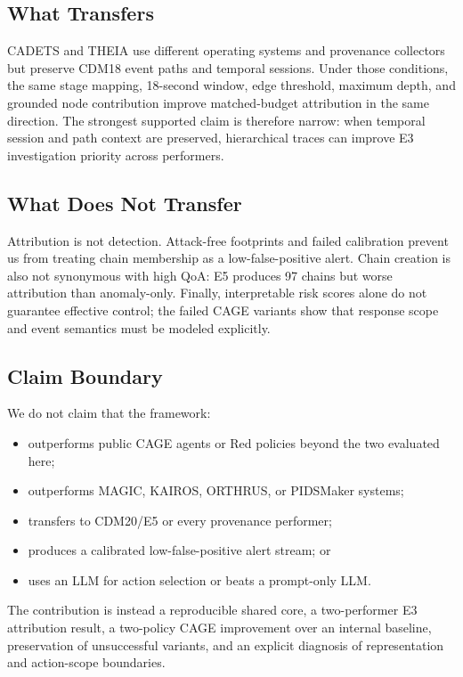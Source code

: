 \documentclass[runningheads]{llncs}
\begin{document}
\subsection{What Transfers}

CADETS and THEIA use different operating systems and provenance collectors but preserve CDM18 event paths and temporal sessions. Under those conditions, the same stage mapping, 18-second window, edge threshold, maximum depth, and grounded node contribution improve matched-budget attribution in the same direction. The strongest supported claim is therefore narrow: when temporal session and path context are preserved, hierarchical traces can improve E3 investigation priority across performers.

\subsection{What Does Not Transfer}

Attribution is not detection. Attack-free footprints and failed calibration prevent us from treating chain membership as a low-false-positive alert. Chain creation is also not synonymous with high QoA: E5 produces 97 chains but worse attribution than anomaly-only. Finally, interpretable risk scores alone do not guarantee effective control; the failed CAGE variants show that response scope and event semantics must be modeled explicitly.

\subsection{Claim Boundary}

We do not claim that the framework:
\begin{itemize}
\item outperforms public CAGE agents or Red policies beyond the two evaluated here;
\item outperforms MAGIC, KAIROS, ORTHRUS, or PIDSMaker systems;
\item transfers to CDM20/E5 or every provenance performer;
\item produces a calibrated low-false-positive alert stream; or
\item uses an LLM for action selection or beats a prompt-only LLM.
\end{itemize}

The contribution is instead a reproducible shared core, a two-performer E3 attribution result, a two-policy CAGE improvement over an internal baseline, preservation of unsuccessful variants, and an explicit diagnosis of representation and action-scope boundaries.
\end{document}

